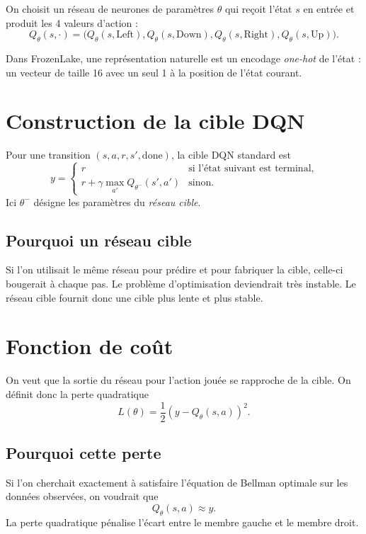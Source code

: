 \documentclass[11pt,a4paper]{article}
\begin{document}
On choisit un réseau de neurones de paramètres $\theta$ qui reçoit l'état $s$ en entrée et produit les 4 valeurs d'action :
\[
Q_{\theta}(s,\cdot) = \big(Q_{\theta}(s,\text{Left}),Q_{\theta}(s,\text{Down}),Q_{\theta}(s,\text{Right}),Q_{\theta}(s,\text{Up})\big).
\]

Dans FrozenLake, une représentation naturelle est un encodage \emph{one-hot} de l'état : un vecteur de taille 16 avec un seul 1 à la position de l'état courant.

\section{Construction de la cible DQN}

Pour une transition $(s,a,r,s',\text{done})$, la cible DQN standard est
\[
y =
\begin{cases}
r & \text{si l'état suivant est terminal},\\[0.4em]
r + \gamma \max_{a'} Q_{\theta^-}(s',a') & \text{sinon.}
\end{cases}
\]
Ici $\theta^-$ désigne les paramètres du \emph{réseau cible}.

\subsection{Pourquoi un réseau cible}

Si l'on utilisait le même réseau pour prédire et pour fabriquer la cible, celle-ci bougerait à chaque pas. Le problème d'optimisation deviendrait très instable. Le réseau cible fournit donc une cible plus lente et plus stable.

\section{Fonction de coût}

On veut que la sortie du réseau pour l'action jouée se rapproche de la cible. On définit donc la perte quadratique
\[
L(\theta)=\frac12\left(y-Q_{\theta}(s,a)\right)^2.
\]

\subsection{Pourquoi cette perte}

Si l'on cherchait exactement à satisfaire l'équation de Bellman optimale sur les données observées, on voudrait que
\[
Q_{\theta}(s,a)\approx y.
\]
La perte quadratique pénalise l'écart entre le membre gauche et le membre droit.
\end{document}
